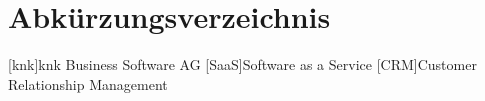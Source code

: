 \documentclass[12pt,bibtotoc]{article}
\newcounter{romanBeginningEnd} %
\begin{document}
    

	
	\setcounter{page}{1} %
	
	\tableofcontents %
	\newpage
	
	\setcounter{secnumdepth}{0} %
	\clearpage
	\listoffigures
	\clearpage
	\newpage
	\section{Abkürzungsverzeichnis}
	\begin{acronym}[LängsteAbkürzung] %
	[knk]{knk Business Software AG}
	[SaaS]{Software as a Service}
	[CRM]{Customer Relationship Management}
	\end{acronym}
	\newpage %
	
	\setcounter{secnumdepth}{3} %
	
	\setcounter{romanBeginningEnd}{\the\value{page}} %
	\setcounter{page}{1} %
	
	
	
	
\end{document}
